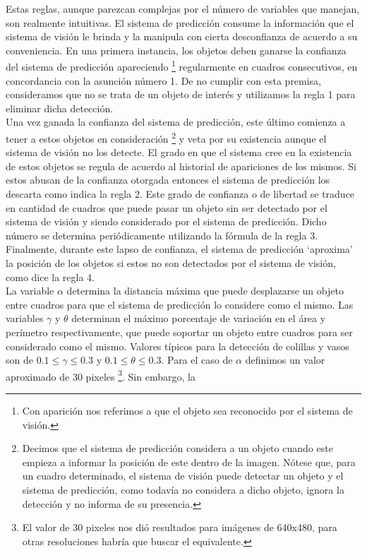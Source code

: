 Estas reglas, aunque parezcan complejas por el número de variables que 
manejan, son realmente intuitivas. El sistema de predicción consume la 
información que el sistema de visión le brinda y la manipula con 
cierta desconfianza de acuerdo a su 
conveniencia. En una primera instancia, los objetos deben ganarse la 
confianza del sistema de predicción apareciendo \footnote{Con 
aparición nos referimos a que el objeto sea reconocido por el sistema 
de visión.} regularmente en 
cuadros consecutivos, en concordancia con la asunción número 
1. De no cumplir con esta premisa, consideramos que no se trata de un 
objeto de interés y utilizamos la regla 1 para eliminar dicha detección. \\
	Una vez ganada la confianza del sistema de predicción, este 
	último comienza a tener a estos objetos en consideración 
	\footnote{Decimos que el sistema de predicción considera a un 
	objeto cuando este empieza a informar la posición de este dentro de la 
	imagen. Nótese que, para un cuadro determinado, el sistema de 
	visión puede detectar un objeto y el sistema de predicción, como 
	todavía no considera a dicho objeto, ignora la detección y no informa de su 
	presencia.} y veta por su 
existencia aunque el sistema de visión no los detecte. El grado en que 
el sistema cree en la existencia de estos objetos se regula de 
acuerdo al historial de apariciones de los mismos. Si estos abusan de 
la confianza otorgada entonces el sistema de predicción los descarta 
como indica la regla 2. 
Este grado de confianza o de libertad se traduce en cantidad de 
cuadros que puede pasar un objeto sin ser detectado por el sistema de 
visión y siendo considerado por el sistema de predicción. Dicho 
número se determina periódicamente utilizando la fórmula de la regla 3.
Finalmente, durante este lapso de confianza, el sistema de predicción 
`aproxima' la posición de los objetos si estos no son detectados por el 
sistema de visión, como dice la regla 4. \\
\indent La variable $\alpha$ determina la distancia máxima que puede 
desplazarse un objeto entre cuadros para que el sistema de predicción lo considere 
como el mismo. Las variables $\gamma$ y $\theta$ determinan el máximo 
porcentaje de variación en el área y perímetro respectivamente, que puede soportar un 
objeto entre cuadros para ser considerado como el mismo. Valores 
típicos para la detección de colillas y vasos son de 
$0.1\leq\gamma\leq0.3$ y $0.1\leq\theta\leq0.3$. Para el caso de 
$\alpha$ definimos un valor aproximado de 30 pixeles \footnote{ El 
valor de 30 pixeles nos dió resultados para imágenes de 640x480, para 
otras resoluciones habría que buscar el equivalente.}. Sin embargo, la 
